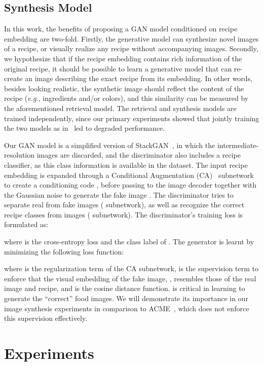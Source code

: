 \documentclass[sigconf,nonacm]{acmart}
\def\eg{\emph{e.g.}} \def\Eg{\emph{E.g.}}
\begin{document}
\subsection{Synthesis Model}

In this work, the benefits of proposing a GAN model conditioned on recipe embedding are two-fold. Firstly, the generative model can synthesize novel images of a recipe, or visually realize any recipe without accompanying images. Secondly, we hypothesize that if the recipe embedding contains rich information of the original recipe, it should be possible to learn a generative model that can re-create an image describing the exact recipe from its embedding. In other words, besides looking realistic, the synthetic image should reflect the content of the recipe (\eg, ingredients and/or colors), and this similarity can be measured by the aforementioned retrieval model. The retrieval and synthesis models are trained independently, since our primary experiments showed that jointly training the two models as in~\cite{wang2019} led to degraded performance.

Our GAN model is a simplified version of StackGAN~\cite{Zhang2017-jm}, in which the intermediate-resolution images are discarded, and the discriminator also includes a recipe classifier, as this class information is available in the dataset. The input recipe embedding  is expanded through a Conditional Augmentation (CA)~\cite{Zhang2017-jm} subnetwork  to create a conditioning code , before passing to the image decoder  together with the Gaussian noise  to generate the fake image . The discriminator  tries to separate 
real  from fake  images
( subnetwork), as well as recognize the correct recipe classes  from images ( subnetwork).
The discriminator's training loss is formulated as:




where  is the 
cross-entropy loss and  
the class label of 
. The generator is learnt by minimizing the following loss function:


where  is the regularization term of the CA subnetwork,  is the supervision term to enforce that the visual embedding of the fake image, , resembles those of the real image and recipe, and  is the cosine distance function.  is critical in learning to generate the ``correct'' food images. We will demonstrate its importance in our image synthesis experiments in comparison to ACME~\cite{wang2019}, which does not enforce this supervision effectively.

\section{Experiments}
\label{sec:exp}
\end{document}
